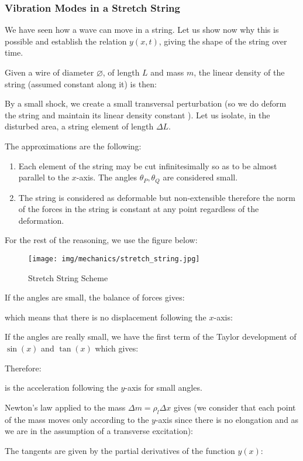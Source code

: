 	\pagebreak
	\subsubsection{Vibration Modes in a Stretch String}
	We have seen how a wave can move in a string. Let us show now why this is possible and establish the relation $y(x, t)$, giving the shape of the string over time.

	Given a wire of diameter $\varnothing$, of length $L$ and mass $m$, the linear density of the string (assumed constant along it) is then:
	
	By a small shock, we create a small transversal perturbation (so we do deform the string and maintain its linear density constant ). Let us isolate, in the disturbed area, a string element of length $\Delta L$.
	
	The approximations are the following:
	\begin{enumerate}
		\item Each element of the string may be cut infinitesimally so as to be almost parallel to the $x$-axis. The angles $\theta_P,\theta_Q$ are considered small.

		\item The string is considered as deformable but non-extensible therefore the norm of the forces in the string is constant at any point regardless of the deformation.
	\end{enumerate}
	For the rest of the reasoning, we use the figure below:
	\begin{figure}[H]
		\centering
		\texttt{[image: img/mechanics/stretch\_string.jpg]}
		\caption{Stretch String Scheme}
	\end{figure}
	If the angles are small, the balance of forces gives:
	
	which means that there is no displacement following the $x$-axis:
	
	If the angles are really small, we have the first term of the Taylor development of $\sin(x)$ and $\tan(x)$ which gives:
	
	Therefore:
	
	is the acceleration following the $y$-axis for small angles.

	Newton's law applied to the mass $\Delta m=\rho_l \Delta x$ gives (we consider that each point of the mass moves only according to the $y$-axis since there is no elongation and as we are in the assumption of a transverse excitation):
	
	The tangents are given by the partial derivatives of the function $y(x)$:
	
